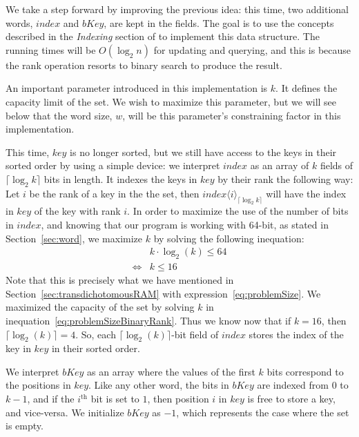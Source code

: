 We take a step forward by improving the previous idea: this time, two additional words, $index$ and $bKey$, are kept in the fields. The goal is to use the concepts described in the \textit{Indexing} section of \cite{patrascu2014dynamic} to implement this data structure. The running times will be $O(\log_2 n)$ for updating and querying, and this is because the rank operation resorts to binary search to produce the result.

An important parameter introduced in this implementation is $k$. It defines the capacity limit of the set. We wish to maximize this parameter, but we will see below that the word size, $w$, will be this parameter's constraining factor in this implementation.

This time, $key$ is no longer sorted, but we still have access to the keys in their sorted order by using a simple device: we interpret $index$ as an array of $k$ fields of $\lceil \log_2 k \rceil$ bits in length. It indexes the keys in $key$ by their rank the following way: Let $i$ be the rank of a key in the the set, then $index\langle i\rangle_{\lceil \log_2 k \rceil}$ will have the index in $key$ of the key with rank $i$.
In order to maximize the use of the number of bits in $index$, and knowing that our program is working with 64-bit, as stated in Section~\ref{sec:word}, we maximize $k$ by solving the following inequation:
\begin{equation} \label{eq:problemSizeBinaryRank}
    \begin{aligned}
        &k \cdot \log_2(k) \leq 64 \\
        \iff &k \leq 16
    \end{aligned}
\end{equation}
Note that this is precisely what we have mentioned in Section~\ref{sec:transdichotomousRAM} with expression~\ref{eq:problemSize}.
We maximized the capacity of the set by solving $k$ in inequation~\ref{eq:problemSizeBinaryRank}.
Thus we know now that if $k = 16$, then $\lceil \log_2(k) \rceil = 4$.
So, each $\lceil \log_2(k) \rceil$-bit field of $index$ stores the index of the key in $key$ in their sorted order.

We interpret $bKey$ as an array where the values of the first $k$ bits correspond to the positions in $key$. Like any other word, the bits in $bKey$ are indexed from $0$ to $k-1$, and if the $i^{\text{th}}$ bit is set to $1$, then position $i$ in $key$ is free to store a key, and vice-versa. We initialize $bKey$ as $-1$, which represents the case where the set is empty.

